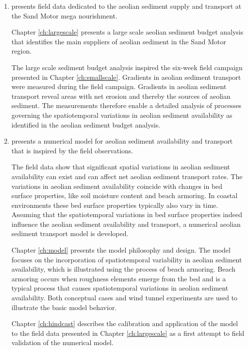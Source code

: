 \begin{enumerate}[{Part} I]
\item presents field data dedicated to the aeolian sediment supply and
  transport at the Sand Motor mega nourishment.

  Chapter \ref{ch:largescale} presents a large scale aeolian sediment
  budget analysis that identifies the main suppliers of aeolian
  sediment in the Sand Motor region.

  The large scale sediment budget analysis inspired the six-week field
  campaign presented in Chapter \ref{ch:smallscale}. Gradients in
  aeolian sediment transport were measured during the field
  campaign. Gradients in aeolian sediment transport reveal areas with
  net erosion and thereby the sources of aeolian sediment. The
  measurements therefore enable a detailed analysis of processes
  governing the spatiotemporal variations in aeolian sediment
  availability as identified in the aeolian sediment budget analysis.

\item presents a numerical model for aeolian sediment
  availability and transport that is inspired by the field
  observations.

  The field data show that significant spatial variations in aeolian
  sediment availability can exist and can affect net aeolian sediment
  transport rates. The variations in aeolian sediment availability
  coincide with changes in bed surface properties, like soil moisture
  content and beach armoring. In coastal environments these bed
  surface properties typically also vary in time. Assuming that the
  spatiotemporal variations in bed surface properties indeed influence
  the aeolian sediment availability and transport, a numerical aeolian
  sediment transport model is developed.

  Chapter \ref{ch:model} presents the model philosophy and design. The
  model focuses on the incorporation of spatiotemporal variability in
  aeolian sediment availability, which is illustrated using the
  process of beach armoring. Beach armoring occurs when roughness
  elements emerge from the bed and is a typical process that causes
  spatiotemporal variations in aeolian sediment availability. Both
  conceptual cases and wind tunnel experiments are used to illustrate
  the basic model behavior.

  Chapter \ref{ch:hindcast} describes the calibration and application
  of the model to the field data presented in Chapter
  \ref{ch:largescale} as a first attempt to field validation of the
  numerical model.


\end{enumerate}
